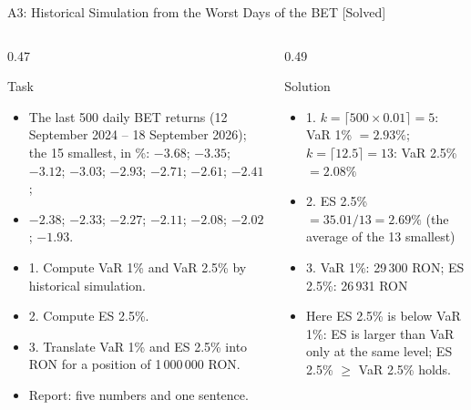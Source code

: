 \begin{frame}{A3: Historical Simulation from the Worst Days of the BET [Solved]}
\itemsize{\scriptsize}
\begin{columns}[T]
\begin{column}{0.47\textwidth}
\begin{block}{Task}
\begin{itemize}
    \item The last 500 daily BET returns (12 September 2024 -- 18 September 2026); the 15 smallest, in \%: $-3.68$; $-3.35$; $-3.12$; $-3.03$; $-2.93$; $-2.71$; $-2.61$; $-2.41$;
    \item $-2.38$; $-2.33$; $-2.27$; $-2.11$; $-2.08$; $-2.02$; $-1.93$.
    \item 1. Compute VaR 1\% and VaR 2.5\% by historical simulation.
    \item 2. Compute ES 2.5\%.
    \item 3. Translate VaR 1\% and ES 2.5\% into RON for a position of 1\,000\,000 RON.
    \item Report: five numbers and one sentence.
\end{itemize}
\end{block}
\end{column}
\begin{column}{0.49\textwidth}
\begin{exampleblock}{Solution}
\begin{itemize}
    \item 1. $k = \lceil 500 \times 0.01 \rceil = 5$: VaR 1\% $= 2.93\%$; $k = \lceil 12.5 \rceil = 13$: VaR 2.5\% $= 2.08\%$
    \item 2. ES 2.5\% $= 35.01/13 = 2.69\%$ (the average of the 13 smallest)
    \item 3. VaR 1\%: 29\,300 RON; ES 2.5\%: 26\,931 RON
    \item Here ES 2.5\% is below VaR 1\%: ES is larger than VaR only at the same level; ES 2.5\% $\ge$ VaR 2.5\% holds.
\end{itemize}
\end{exampleblock}
\end{column}
\end{columns}
\end{frame}

